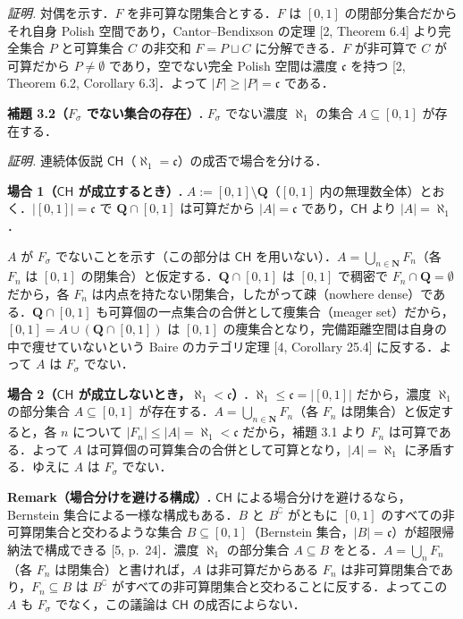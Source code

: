 \documentclass[
  lualatex,ja=standard]{bxjsarticle}
\begin{document}
\emph{証明.} 対偶を示す．\(F\) を非可算な閉集合とする．\(F\) は
\([0,1]\) の閉部分集合だからそれ自身 Polish
空間であり，Cantor--Bendixson の定理 {[}2, Theorem 6.4{]} より完全集合
\(P\) と可算集合 \(C\) の非交和 \(F = P \sqcup C\) に分解できる．\(F\)
が非可算で \(C\) が可算だから \(P \ne \emptyset\) であり，空でない完全
Polish 空間は濃度 \(\mathfrak{c}\) を持つ {[}2, Theorem 6.2, Corollary
6.3{]}．よって \(\lvert F\rvert \ge \lvert P\rvert = \mathfrak{c}\)
である．

\textbf{補題 3.2（\(F_\sigma\) でない集合の存在）.} \(F_\sigma\)
でない濃度 \(\aleph_1\) の集合 \(A \subseteq [0,1]\) が存在する．

\emph{証明.} 連続体仮説
\(\mathsf{CH}\)（\(\aleph_1 = \mathfrak{c}\)）の成否で場合を分ける．

\textbf{場合 1（\(\mathsf{CH}\) が成立するとき）.}
\(A := [0,1] \setminus \mathbf{Q}\)（\([0,1]\)
内の無理数全体）とおく．\(\lvert[0,1]\rvert = \mathfrak{c}\) で
\(\mathbf{Q} \cap [0,1]\) は可算だから \(\lvert A\rvert = \mathfrak{c}\)
であり，\(\mathsf{CH}\) より \(\lvert A\rvert = \aleph_1\)．

\(A\) が \(F_\sigma\) でないことを示す（この部分は \(\mathsf{CH}\)
を用いない）．\(A = \bigcup_{n\in\mathbf{N}} F_n\)（各 \(F_n\) は
\([0,1]\) の閉集合）と仮定する．\(\mathbf{Q} \cap [0,1]\) は \([0,1]\)
で稠密で \(F_n \cap \mathbf{Q} = \emptyset\) だから，各 \(F_n\)
は内点を持たない閉集合，したがって疎（nowhere
dense）である．\(\mathbf{Q} \cap [0,1]\)
も可算個の一点集合の合併として痩集合（meager
set）だから，\([0,1] = A \cup (\mathbf{Q} \cap [0,1])\) は \([0,1]\)
の痩集合となり，完備距離空間は自身の中で痩せていないという Baire
のカテゴリ定理 {[}4, Corollary 25.4{]} に反する．よって \(A\) は
\(F_\sigma\) でない．

\textbf{場合 2（\(\mathsf{CH}\)
が成立しないとき，\(\aleph_1 < \mathfrak{c}\)）.}
\(\aleph_1 \le \mathfrak{c} = \lvert[0,1]\rvert\) だから，濃度
\(\aleph_1\) の部分集合 \(A \subseteq [0,1]\)
が存在する．\(A = \bigcup_{n\in\mathbf{N}} F_n\)（各 \(F_n\)
は閉集合）と仮定すると，各 \(n\) について
\(\lvert F_n\rvert \le \lvert A\rvert = \aleph_1 < \mathfrak{c}\)
だから，補題 3.1 より \(F_n\) は可算である．よって \(A\)
は可算個の可算集合の合併として可算となり，\(\lvert A\rvert = \aleph_1\)
に矛盾する．ゆえに \(A\) は \(F_\sigma\) でない．

\textbf{Remark（場合分けを避ける構成）.} \(\mathsf{CH}\)
による場合分けを避けるなら，Bernstein 集合による一様な構成もある．\(B\)
と \(B^\complement\) がともに \([0,1]\)
のすべての非可算閉集合と交わるような集合
\(B \subseteq [0,1]\)（Bernstein
集合，\(\lvert B\rvert = \mathfrak{c}\)）が超限帰納法で構成できる {[}5,
p.~24{]}．濃度 \(\aleph_1\) の部分集合 \(A \subseteq B\)
をとる．\(A = \bigcup_n F_n\)（各 \(F_n\) は閉集合）と書ければ，\(A\)
は非可算だからある \(F_n\) は非可算閉集合であり，\(F_n \subseteq B\) は
\(B^\complement\) がすべての非可算閉集合と交わることに反する．よってこの
\(A\) も \(F_\sigma\) でなく，この議論は \(\mathsf{CH}\)
の成否によらない．
\end{document}
